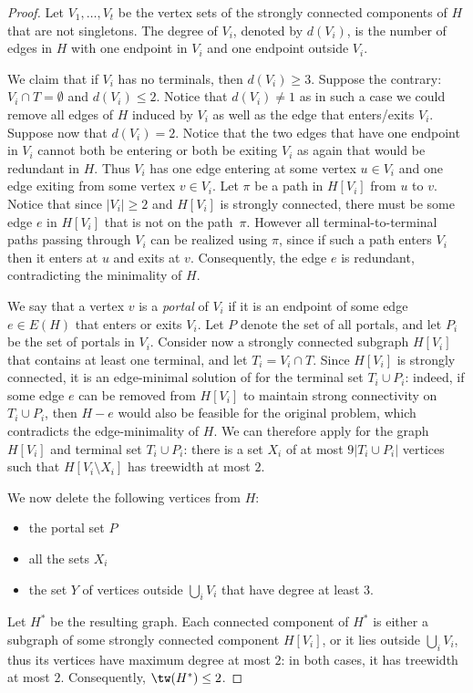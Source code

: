 \begin{proof}
Let $V_1,\dots,V_t$ be the vertex sets of the strongly connected components of $H$ that are not singletons. The degree of $V_i$, denoted by $d(V_i)$, is the number of edges in $H$ with one endpoint in $V_i$ and one endpoint outside $V_i$.

We claim that if $V_i$ has no terminals, then  $d(V_i)\geq 3$. Suppose the contrary: $V_i\cap T=\emptyset$ and $d(V_i)\leq 2$. Notice that $d(V_i)\neq 1$ as in such a case we could remove all edges of $H$ induced by $V_i$ as well as the edge that enters/exits $V_i$. Suppose now that $d(V_i)=2$. Notice that the two edges that have one endpoint in $V_i$ cannot both be entering or both be exiting $V_i$ as again that would be redundant in $H$. Thus $V_i$ has one edge entering at some vertex $u\in V_i$ and one edge exiting from some vertex $v\in V_i$. Let $\pi$ be a path in $H[V_i]$ from $u$ to $v$. Notice that since $|V_i|\geq 2$ and $H[V_i]$ is strongly connected, there must be some edge $e$ in $H[V_i]$ that is not on the path~$\pi$. However all terminal-to-terminal paths passing through $V_i$ can be realized using $\pi$, since if such a path enters $V_i$ then it enters at $u$ and exits at $v$. Consequently, the edge $e$ is redundant, contradicting the minimality of $H$.

We say that a vertex $v$ is a \emph{portal} of $V_i$ if it is an endpoint of some edge $e\in E(H)$ that enters or exits $V_i$. Let $P$ denote the set of all portals, and let $P_i$ be the set of portals in $V_i$. Consider now a strongly connected subgraph $H[V_i]$ that contains at least one terminal, and let $T_i=V_i\cap T$. Since $H[V_i]$ is strongly connected, it is an edge-minimal solution of \scssfull for the terminal set $T_i\cup P_i$: indeed, if some edge $e$ can be removed from $H[V_i]$ to maintain strong connectivity on $T_i\cup P_i$, then $H-e$ would also be feasible for the original problem, which contradicts the edge-minimality of $H$. We can therefore apply  for the graph $H[V_i]$ and terminal set $T_i\cup P_i$: there is a set $X_i$ of at most $9|T_i\cup P_i|$ vertices such that $H[V_i\setminus X_i]$ has treewidth at most $2$.

We now delete the following vertices from $H$:
\begin{itemize}
\item the portal set $P$
\item all the sets $X_i$
\item the set $Y$ of vertices outside $\bigcup_i V_i$ that have degree at least $3$.
\end{itemize}
Let $H^*$ be the resulting graph. Each connected component of $H^*$ is either a subgraph of some strongly connected component $H[V_i]$, or it lies outside $\bigcup_i V_i$, thus its vertices have maximum degree at most $2$: in both cases, it has treewidth at most $2$. Consequently, $\tw(H^*)\leq 2$.


\end{proof}

